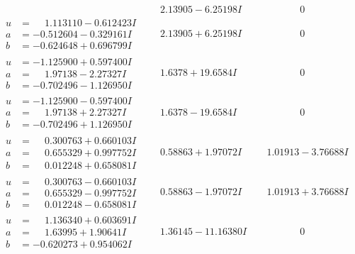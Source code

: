 \documentclass[1p]{elsarticle_modified}
\theoremstyle{definition}
\begin{document}
$$\begin{array}{c|c|c}
 & \phantom{-}2.13905 - 6.25198 I & \phantom{-0.000000 } 0 \\ \hline\begin{aligned}
u &= \phantom{-}1.113110 - 0.612423 I \\
a &= -0.512604 - 0.329161 I \\
b &= -0.624648 + 0.696799 I\end{aligned}
 & \phantom{-}2.13905 + 6.25198 I & \phantom{-0.000000 } 0 \\ \hline\begin{aligned}
u &= -1.125900 + 0.597400 I \\
a &= \phantom{-}1.97138 - 2.27327 I \\
b &= -0.702496 - 1.126950 I\end{aligned}
 & \phantom{-}1.6378 + 19.6584 I & \phantom{-0.000000 } 0 \\ \hline\begin{aligned}
u &= -1.125900 - 0.597400 I \\
a &= \phantom{-}1.97138 + 2.27327 I \\
b &= -0.702496 + 1.126950 I\end{aligned}
 & \phantom{-}1.6378 - 19.6584 I & \phantom{-0.000000 } 0 \\ \hline\begin{aligned}
u &= \phantom{-}0.300763 + 0.660103 I \\
a &= \phantom{-}0.655329 + 0.997752 I \\
b &= \phantom{-}0.012248 + 0.658081 I\end{aligned}
 & \phantom{-}0.58863 + 1.97072 I & \phantom{-}1.01913 - 3.76688 I \\ \hline\begin{aligned}
u &= \phantom{-}0.300763 - 0.660103 I \\
a &= \phantom{-}0.655329 - 0.997752 I \\
b &= \phantom{-}0.012248 - 0.658081 I\end{aligned}
 & \phantom{-}0.58863 - 1.97072 I & \phantom{-}1.01913 + 3.76688 I \\ \hline\begin{aligned}
u &= \phantom{-}1.136340 + 0.603691 I \\
a &= \phantom{-}1.63995 + 1.90641 I \\
b &= -0.620273 + 0.954062 I\end{aligned}
 & \phantom{-}1.36145 - 11.16380 I & \phantom{-0.000000 } 0 \\ \hline\begin{aligned}

\end{aligned}
\end{array}$$
\end{document}
